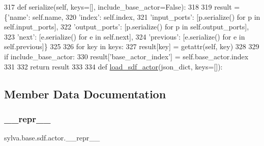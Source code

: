 \begin{DoxyCode}
317         \textcolor{keyword}{def }serialize(self, keys=[], include\_base\_actor=False):
318 
319             result = \{\textcolor{stringliteral}{'name'}: self.name,
320                       \textcolor{stringliteral}{'index'}: self.index,
321                       \textcolor{stringliteral}{'input\_ports'}: [p.serialize() \textcolor{keywordflow}{for} p \textcolor{keywordflow}{in} self.input\_ports],
322                       \textcolor{stringliteral}{'output\_ports'}: [p.serialize() \textcolor{keywordflow}{for} p \textcolor{keywordflow}{in} self.output\_ports],
323                       \textcolor{stringliteral}{'next'}: [e.serialize() \textcolor{keywordflow}{for} e \textcolor{keywordflow}{in} self.next],
324                       \textcolor{stringliteral}{'previous'}: [e.serialize() \textcolor{keywordflow}{for} e \textcolor{keywordflow}{in} self.previous]\}
325 
326             \textcolor{keywordflow}{for} key \textcolor{keywordflow}{in} keys:
327                 result[key] = getattr(self, key)
328 
329             \textcolor{keywordflow}{if} include\_base\_actor:
330                 result[\textcolor{stringliteral}{'base\_actor\_index'}] = self.base\_actor.index
331 
332             \textcolor{keywordflow}{return} result
333 
334     \textcolor{keyword}{def }\hyperlink{namespacesylva_1_1base_1_1sdf_a14b2bfbb0fd81d1e114b670f13f718f1}{load\_sdf\_actor}(json\_dict, keys=[]):
\end{DoxyCode}


\subsection{Member Data Documentation}
\mbox{\label{classsylva_1_1base_1_1sdf_1_1actor_a3f5b51bf4c0ca79d2086bc8036b4651e}} 
\subsubsection{\texorpdfstring{\+\_\+\+\_\+repr\+\_\+\+\_\+}{\_\_repr\_\_}}
{\footnotesize\ttfamily sylva.\+base.\+sdf.\+actor.\+\_\+\+\_\+repr\+\_\+\+\_\+\hspace{0.3cm}{\ttfamily [private]}}



